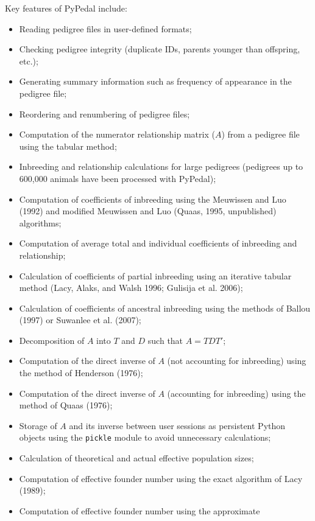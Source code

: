 \documentclass[
  letterpaper,
  DIV=11,
  numbers=noendperiod]{scrreprt}
\providecommand{\tightlist}{%
  \setlength{\itemsep}{0pt}\setlength{\parskip}{0pt}}
\begin{document}
Key features of PyPedal include:

\begin{itemize}
\tightlist
\item
  Reading pedigree files in user-defined formats;
\item
  Checking pedigree integrity (duplicate IDs, parents younger than
  offspring, etc.);
\item
  Generating summary information such as frequency of appearance in the
  pedigree file;
\item
  Reordering and renumbering of pedigree files;
\item
  Computation of the numerator relationship matrix (\(A\)) from a
  pedigree file using the tabular method;
\item
  Inbreeding and relationship calculations for large pedigrees
  (pedigrees up to 600,000 animals have been processed with PyPedal);
\item
  Computation of coefficients of inbreeding using the Meuwissen and Luo
  (1992) and modified Meuwissen and Luo (Quaas, 1995, unpublished)
  algorithms;
\item
  Computation of average total and individual coefficients of inbreeding
  and relationship;
\item
  Calculation of coefficients of partial inbreeding using an iterative
  tabular method (Lacy, Alaks, and Walsh 1996; Gulisija et al. 2006);
\item
  Calculation of coefficients of ancestral inbreeding using the methods
  of Ballou (1997) or Suwanlee et al. (2007);
\item
  Decomposition of \(A\) into \(T\) and \(D\) such that \(A=TDT'\);
\item
  Computation of the direct inverse of \(A\) (not accounting for
  inbreeding) using the method of Henderson (1976);
\item
  Computation of the direct inverse of \(A\) (accounting for inbreeding)
  using the method of Quaas (1976);
\item
  Storage of \(A\) and its inverse between user sessions as persistent
  Python objects using the \texttt{pickle} module to avoid unnecessary
  calculations;
\item
  Calculation of theoretical and actual effective population sizes;
\item
  Computation of effective founder number using the exact algorithm of
  Lacy (1989);
\item
  Computation of effective founder number using the approximate

\end{itemize}
\end{document}
